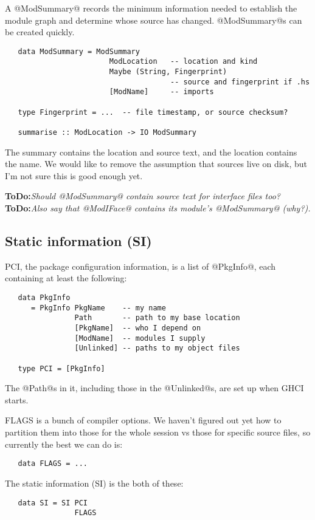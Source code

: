 \documentclass[11pt]{article}
\newcommand{\ToDo}[1]{{{\bf ToDo:}\sl #1}}
\begin{document}
A @ModSummary@ records the minimum information needed to establish the
module graph and determine whose source has changed.  @ModSummary@s
can be created quickly.
\begin{verbatim}
   data ModSummary = ModSummary 
                        ModLocation   -- location and kind
                        Maybe (String, Fingerprint)
                                      -- source and fingerprint if .hs
                        [ModName]     -- imports

   type Fingerprint = ...  -- file timestamp, or source checksum?

   summarise :: ModLocation -> IO ModSummary
\end{verbatim}

The summary contains the location and source text, and the location
contains the name.  We would like to remove the assumption that
sources live on disk, but I'm not sure this is good enough yet.

\ToDo{Should @ModSummary@ contain source text for interface files too?}
\ToDo{Also say that @ModIFace@ contains its module's @ModSummary@  (why?).}


\subsection{Static information (SI)}
\label{sec:staticinfo}

PCI, the package configuration information, is a list of @PkgInfo@,
each containing at least the following:
\begin{verbatim}
   data PkgInfo
      = PkgInfo PkgName    -- my name
                Path       -- path to my base location
                [PkgName]  -- who I depend on
                [ModName]  -- modules I supply
                [Unlinked] -- paths to my object files

   type PCI = [PkgInfo]
\end{verbatim}
The @Path@s in it, including those in the @Unlinked@s, are set up
when GHCI starts.  

FLAGS is a bunch of compiler options.  We haven't figured out yet how
to partition them into those for the whole session vs those for
specific source files, so currently the best we can do is:
\begin{verbatim}
   data FLAGS = ...
\end{verbatim}

The static information (SI) is the both of these:
\begin{verbatim}
   data SI = SI PCI
                FLAGS
\end{verbatim}
\end{document}
